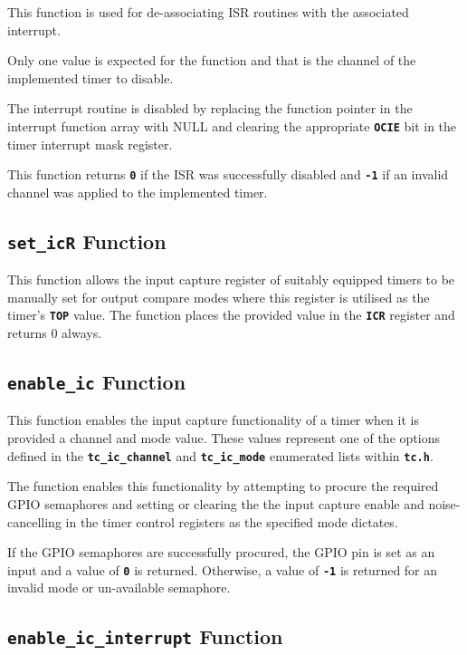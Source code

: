 \documentclass[a4paper, oneside, 11pt, titlepage, onecolumn, openright]{report}
\begin{document}
			This function is used for de-associating ISR routines with the associated interrupt.
			
			Only one value is expected for the function and that is the channel of the implemented timer to disable.
			
			The interrupt routine is disabled by replacing the function pointer in the interrupt function array with NULL and clearing the appropriate \textbf{\texttt{OCIE}} bit in the timer interrupt mask register.
			
			This function returns \textbf{\texttt{0}} if the ISR was successfully disabled and \textbf{\texttt{-1}} if an invalid channel was applied to the implemented timer.
			
\subsection{\textbf{\texttt{set\_icR}} Function}
			\label{ss:HALtcset_icRFunction}
			
			This function allows the input capture register of suitably equipped timers to be manually set for output compare modes where this register is utilised as the timer's \textbf{\texttt{TOP}} value.
			The function places the provided value in the \textbf{\texttt{ICR}} register and returns 0 always.
			
\subsection{\textbf{\texttt{enable\_ic}} Function}
			\label{ss:HALtcenable_icFunction}
			
			This function enables the input capture functionality of a timer when it is provided a channel and mode value. These values represent one of the options defined in the \textbf{\texttt{tc\_ic\_channel}} and \textbf{\texttt{tc\_ic\_mode}} enumerated lists within \textbf{\texttt{tc.h}}.
			
			The function enables this functionality by attempting to procure the required GPIO semaphores and setting or clearing the the input capture enable and noise-cancelling in the timer control registers as the specified mode dictates.
			
			If the GPIO semaphores are successfully procured, the GPIO pin is set as an input and a value of \textbf{\texttt{0}} is returned. Otherwise, a value of \textbf{\texttt{-1}} is returned for an invalid mode or un-available semaphore.
			
\subsection{\textbf{\texttt{enable\_ic\_interrupt}} Function}
			\label{ss:HALtcenable_ic_interruptFunction}
			
\end{document}
